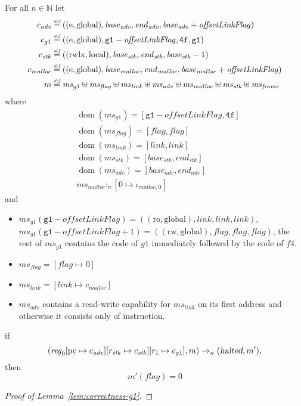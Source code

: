 \documentclass[a4paper]{article}
\newcommand{\update}[2]{[#1 \mapsto #2]}
\newcommand{\defeq}{\stackrel{\textit{\tiny{def}}}{=}}
\DeclareMathOperator{\dom}{dom}
\newcommand{\var}[1]{\mathit{#1}}
\newcommand{\hs}{\var{ms}}
\newcommand{\ms}{\hs}
\newcommand{\pcreg}{\mathrm{pc}}
\newcommand{\start}{\var{base}}
\newcommand{\addrend}{\var{end}}
\newcommand{\reg}{\var{reg}}
\newcommand{\heap}{\var{mem}}
\newcommand{\adv}{\var{adv}}
\newcommand{\link}{\var{link}}
\newcommand{\stk}{\var{stk}}
\newcommand{\flag}{\var{flag}}
\newcommand{\olf}{\var{offsetLinkFlag}}
\newcommand{\halted}{\textsl{halted}}
\newcommand{\heapSat}[3][\heap]{#1 :_{#2} #3}
\newcommand{\codelabel}[1]{\mathit{#1}}
\newcommand{\malloc}{\codelabel{malloc}}
\newcommand{\nats}{\mathbb{N}}
\newcommand{\plainperm}[1]{\mathrm{#1}}
\newcommand{\readonly}{\plainperm{ro}}
\newcommand{\readwrite}{\plainperm{rw}}
\newcommand{\entry}{\plainperm{e}}
\newcommand{\rwlx}{\plainperm{rwlx}}
\newcommand{\local}{\plainperm{local}}
\newcommand{\glob}{\plainperm{global}}
\newcommand{\step}[1][]{\rightarrow_{#1}}
\begin{document}
\begin{lemma}
\begin{lemma}[Correctness of $g1$]
  \label{lem:correctness-g1}
  For all $n \in \nats$
  let
  \begin{align*}
    c_{\var{adv}} & \defeq ((\entry,\glob),\start_{\adv},\addrend_{\adv},\start_{\adv}+\olf) \\
    c_{g1} & \defeq ((\entry,\glob),\mathtt{g1}-\olf,\mathtt{4f},\mathtt{g1}) \\
    c_\stk & \defeq ((\rwlx,\local),\start_\stk,\addrend_\stk,\start_\stk-1) \\
    c_\malloc & \defeq ((\entry,\glob),\start_\malloc,\addrend_\malloc,\start_\malloc+\olf) \\
    m & \defeq \hs_{g1} \uplus 
        \ms_\flag \uplus                
        \ms_\link \uplus 
        \ms_\adv \uplus 
        \ms_\malloc \uplus 
        \ms_\stk \uplus
        \ms_{\var{frame}} 
  \end{align*}
  where 
  \begin{align*}
    &\dom(\hs_{g1}) = [\mathtt{g1}-\olf,\mathtt{4f}] \\
    &\dom(\hs_\flag) = [\flag,\flag] \\
    &\dom(\ms_\link) = [\link,\link]\\
    &\dom(\ms_\stk) = [\start_\stk, \addrend_\stk]\\
    &\dom(\hs_{\adv}) = [\start_\adv,\addrend_\adv] \\
    &\heapSat[\hs_{\malloc}]{n}{[0 \mapsto \iota_{\malloc,0}]}
  \end{align*}
  and
  \begin{itemize}
  \item $\ms_{g1}(\mathtt{g1}-\olf) = ((\readonly,\glob),\link,\link,\link)$, $\ms_{g1}(\mathtt{g1}-\olf+1) = ((\readwrite,\glob),\flag,\flag,\flag)$, the rest of $\hs_{g1}$ contains the code of $g1$ immediately followed by the code of $f4$.
  \item $\ms_\flag = [\flag \mapsto 0]$
  \item $\ms_{\var{link}} = [\link \mapsto c_\malloc]$
  \item $\hs_\adv$ contains a read-write capability for $\hs_\link$ on its first address and otherwise it consists only of instruction.
  \end{itemize}
  if 
  \[
    (\reg_0\update{\pcreg}{c_\adv}\update{r_\stk}{c_\stk}\update{r_1}{c_{g1}},m) \step[n] (\halted,m'),
  \]
  then
  \[
    m'(\flag) = 0
  \]  
\end{lemma}
\begin{proof}[Proof of Lemma~\ref{lem:correctness-g1}]

\end{proof}
\end{lemma}
\end{document}
